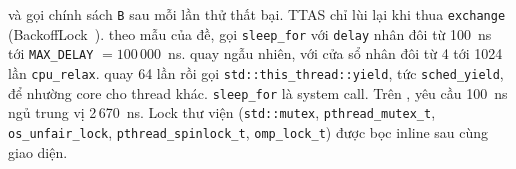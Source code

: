 và  gọi chính sách \texttt{B} sau mỗi lần thử thất bại.
TTAS chỉ lùi lại khi thua \texttt{exchange} (BackoffLock~\cite{herlihy2020art}).  theo
mẫu của đề, gọi \texttt{sleep\_for} với \texttt{delay} nhân đôi từ 100~ns tới \texttt{MAX\_DELAY}
$= 100\,000$~ns.  quay ngẫu nhiên, với cửa sổ nhân đôi từ 4 tới 1024 lần \texttt{cpu\_relax}.
 quay 64 lần rồi gọi \texttt{std::this\_thread::yield}, tức \texttt{sched\_yield}, để
nhường core cho thread khác. \texttt{sleep\_for} là system call. Trên
, yêu cầu 100~ns ngủ trung vị 2\,670~ns. Lock thư viện (\texttt{std::mutex},
\texttt{pthread\_mutex\_t}, \texttt{os\_unfair\_lock}, \texttt{pthread\_spinlock\_t},
\texttt{omp\_lock\_t}) được bọc inline sau cùng giao diện.
